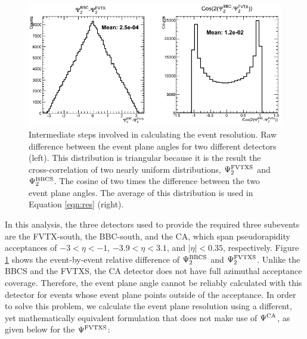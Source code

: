 \begin{figure}[!h]
\centering
\includegraphics[width=0.75\linewidth]{figs/resolution_intermediate_calc.png}
\caption{Intermediate steps involved in calculating the event resolution. Raw difference between the event plane angles for two different detectors (left). This distribution is triangular because it is the result the cross-correlation of two nearly uniform distributions, $\Psi_2^{\rm FVTXS}$ and $\Psi_2^{\rm BBCS}$. The cosine of two times the difference between the two event plane angles. The average of this distribution is used in Equation \ref{eqn:res} (right).}
\label{fig:res_interm_calc}
\end{figure}

In this analysis, the three detectors used to provide the required three subevents are the FVTX-south, the BBC-south, and the CA, which span pseudorapidity acceptances of $-3 <\eta < -1$, $-3.9 < \eta < 3.1$, and $|\eta| < 0.35$, respectively. Figure \ref{fig:res_interm_calc} shows the event-by-event relative difference of $\Psi_2^{\rm BBCS}$ and $\Psi_2^{\rm FVTXS}$. Unlike the BBCS and the FVTXS, the CA detector does not have full azimuthal acceptance coverage. Therefore, the event plane angle cannot be reliably calculated with this detector for events whose event plane points outside of the acceptance. In order to solve this problem, we calculate the event plane resolution using a different, yet mathematically equivalent formulation that does not make use of $\Psi^{\rm CA}$, as given below for the $\Psi^{\rm FVTXS}$:

